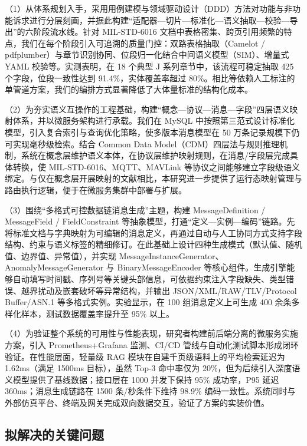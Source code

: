 （1）从体系规划入手，采用用例建模与领域驱动设计（DDD）方法对功能与非功能诉求进行分层刻画，并据此构建“适配器—切片—标准化—语义抽取—校验—导出”的六阶段流水线。针对 MIL-STD-6016 文档中表格密集、跨页引用频繁的特点，我们在每个阶段引入可追溯的质量门控：双路表格抽取（Camelot / pdfplumber）与章节识别协同、位段归一化结合中间语义模型（SIM）、增量式 YAML 校验等。实测表明，在 18 个典型 J 系列章节中，该流程可稳定抽取 425 个字段，位段一致性达到 91.4\%，实体覆盖率超过 80\%。相比\cite{MIL_STD_6016_Active_2024,MITRE_Link16_Interoperability_2024}等依赖人工标注的单管道方案，我们的编排方式显著降低了大体量标准的结构化成本。

（2）为夯实语义互操作的工程基础，构建“概念—协议—消息—字段”四层语义映射体系，并以微服务架构进行承载。我们在 MySQL 中按照第三范式设计标准化模型，引入复合索引与查询优化策略，使多版本消息模型在 50 万条记录规模下仍可实现毫秒级检索。结合 Common Data Model（CDM）四层法\cite{Laigner2021Data,Waseem2021Design}与规则推理机制，系统在概念层维护语义本体，在协议层维护映射规则，在消息/字段层完成具体转换，使 MIL-STD-6016、MQTT、MAVLink 等协议之间能够建立字段级语义绑定。与仅在概念层开展映射的文献\cite{Hamdan2023Reference}相比，本研究进一步提供了运行态映射管理与路由执行逻辑，便于在微服务集群中部署与扩展。

（3）围绕“多格式可控数据链消息生成”主题，构建 MessageDefinition / MessageField / FieldConstraint 等抽象模型，打通“定义—实例—编码”链路。先将标准文档与字典映射为可编辑的消息定义，再通过自动与人工协同方式支持字段结构、约束与语义标签的精细修订。在此基础上设计四种生成模式（默认值、随机值、边界值、异常值），并实现 MessageInstanceGenerator、AnomalyMessageGenerator 与 BinaryMessageEncoder 等核心组件。生成引擎能够自动填写时间戳、序列号等关键头部信息，可依据约束注入字段缺失、类型错误、越界扰动及嵌套破坏等异常结构，并输出 JSON/XML/RAW/TLV/Protocol Buffer/ASN.1 等多格式实例。实验显示，在 100 组消息定义上可生成 400 余条多样化样本，测试数据覆盖率提升至 95\% 以上。

（4）为验证整个系统的可用性与性能表现，研究者构建前后端分离的微服务实施方案，引入 Prometheus+Grafana 监测、CI/CD 管线与自动化测试脚本形成闭环验证。在性能层面，轻量级 RAG 模块在自建千页级语料上的平均检索延迟为 1.62ms（满足 1500ms 目标），虽然 Top-3 命中率仅为 20\%，但为后续引入深度语义模型提供了基线数据；接口层在 1000 并发下保持 95\% 成功率，P95 延迟 360ms；消息生成链路在 1500 条/秒条件下维持 98.9\% 编码一致性。系统同时与外部仿真平台、终端及网关完成双向数据交互\cite{SAIC_JRE_Overview_2021,Collins_TTR_2021,L3Harris_STT_KOR24A_2020}，验证了方案的实装价值。


\subsection{拟解决的关键问题}

